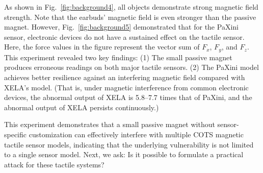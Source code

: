 As shown in Fig.~\ref{fig:background4}, all objects demonstrate strong magnetic field strength. Note that the earbuds' magnetic field is even stronger than the passive magnet.
However, Fig.~\ref{fig:background5} demonstrated that for the PaXini sensor, electronic devices do not have a sustained effect on the tactile sensor. 
Here, the force values in the figure represent the vector sum of $F_x$, $F_y$, and $F_z$.
This experiment revealed two key findings: 
(1) The small passive magnet produces erroneous readings on both major tactile sensors.
(2) The PaXini model achieves better resilience against an interfering magnetic field compared with XELA's model. (That is, under magnetic interference from common electronic devices, the abnormal output of XELA is 5.8--7.7 times that of PaXini, and the abnormal output of XELA persists continuously.)

This experiment demonstrates that a small passive magnet without sensor-specific customization can effectively interfere with multiple COTS magnetic tactile sensor models, indicating that the underlying vulnerability is not limited to a single sensor model.
Next, we ask: Is it possible to formulate a practical attack for these tactile systems?

